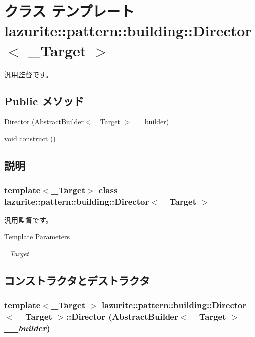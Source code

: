\hypertarget{classlazurite_1_1pattern_1_1building_1_1_director_3_01___target_01_4}{
\section{クラス テンプレート lazurite::pattern::building::Director$<$ \_\-Target $>$}
\label{classlazurite_1_1pattern_1_1building_1_1_director_3_01___target_01_4}
}


汎用監督です。  
\subsection*{Public メソッド}
\begin{DoxyCompactItemize}
\item 
\hyperlink{classlazurite_1_1pattern_1_1building_1_1_director_3_01___target_01_4_acabfbf957f2ec48f4e7e93e1c4a00d6e}{Director} (AbstractBuilder$<$ \_\-Target $>$ \_\-\_\-builder)
\item 
void \hyperlink{classlazurite_1_1pattern_1_1building_1_1_director_3_01___target_01_4_a04573e86602f5d609ebcca589c36cb4f}{construct} ()
\end{DoxyCompactItemize}


\subsection{説明}
\subsubsection*{template$<$\_\-Target$>$ class lazurite::pattern::building::Director$<$ \_\-Target $>$}

汎用監督です。 
\begin{DoxyTemplParams}{Template Parameters}
\item[{\em \_\-Target}]\end{DoxyTemplParams}


\subsection{コンストラクタとデストラクタ}
\hypertarget{classlazurite_1_1pattern_1_1building_1_1_director_3_01___target_01_4_acabfbf957f2ec48f4e7e93e1c4a00d6e}{
\subsubsection[{Director}]{\setlength{\rightskip}{0pt plus 5cm}template$<$\_\-Target $>$ lazurite::pattern::building::Director$<$ \_\-Target $>$::Director (AbstractBuilder$<$ \_\-Target $>$ {\em \_\-\_\-builder})}}
\label{classlazurite_1_1pattern_1_1building_1_1_director_3_01___target_01_4_acabfbf957f2ec48f4e7e93e1c4a00d6e}

